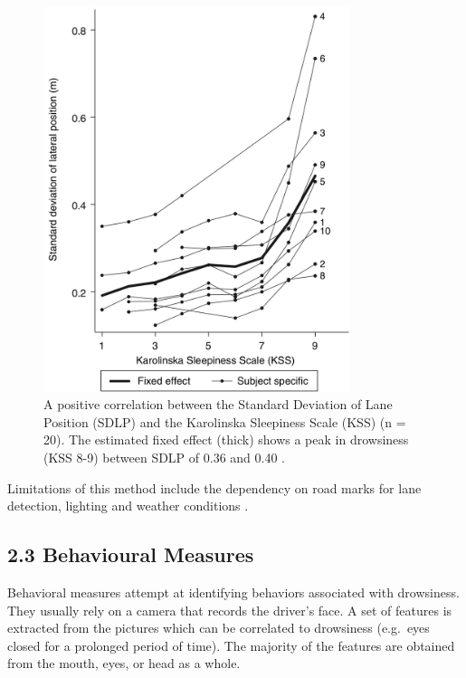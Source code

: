 \documentclass[a4paper, 12pt]{extarticle}
\begin{document}
\begin{figure}[ht]
    \centering
    \includegraphics[width=0.8\textwidth]{img/lane_position.png}
    \caption{A positive correlation between the Standard
Deviation of Lane Position (SDLP) and the Karolinska Sleepiness Scale
(KSS) (n = 20). The estimated fixed effect (thick) shows a peak in
drowsiness (KSS 8-9) between SDLP of 0.36 and 0.40 \cite{ingre_subjective_2006}. }
    \label{fig:lane_position}
\end{figure}

Limitations of this method include the dependency on road marks for lane detection, lighting and weather
conditions \cite{sahayadhas_detecting_2012}.

\hypertarget{behavioural-measures}{%
\subsection{2.3 Behavioural Measures}\label{behavioural-measures}}

Behavioral measures attempt at identifying behaviors associated with
drowsiness. They usually rely on a camera that records the driver's
face. A set of features is extracted from the pictures which can be
correlated to drowsiness (e.g.~eyes closed for a prolonged period of
time). The majority of the features are obtained from the mouth, eyes,
or head as a whole.
\end{document}

